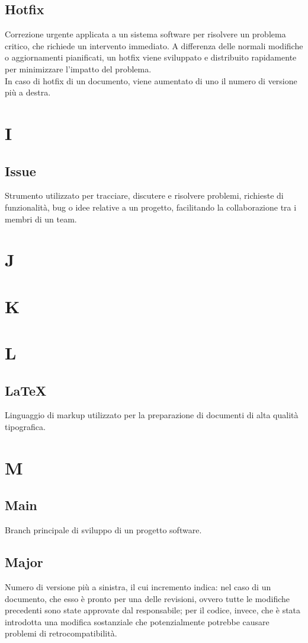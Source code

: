     \subsection{Hotfix}
    Correzione urgente applicata a un sistema software per risolvere un problema critico, 
    che richiede un intervento immediato. A differenza delle normali modifiche o aggiornamenti pianificati, 
    un hotfix viene sviluppato e distribuito rapidamente per minimizzare l'impatto del problema.\\
    In caso di hotfix di un documento, viene aumentato di uno il numero di versione più a destra.

\section{I}
    \subsection{Issue}
    Strumento utilizzato per tracciare, discutere e risolvere problemi, richieste di funzionalità, 
    bug o idee relative a un progetto, facilitando la collaborazione tra i membri di un team.
\section{J}
\section{K}
\section{L}
    \subsection{LaTeX}
    Linguaggio di markup utilizzato per la preparazione di documenti di alta qualità tipografica.
\section{M}
    \subsection{Main}
    Branch principale di sviluppo di un progetto software.
    \subsection{Major}
    Numero di versione più a sinistra, il cui incremento indica: nel caso di un documento, che esso è pronto per una delle revisioni, ovvero tutte le modifiche precedenti sono state 
    approvate dal responsabile; per il codice, invece, che è stata introdotta una modifica sostanziale che potenzialmente potrebbe causare problemi di retrocompatibilità.
